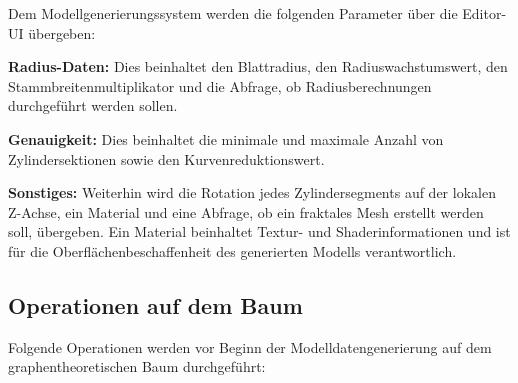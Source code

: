 Dem Modellgenerierungssystem werden die folgenden Parameter über die Editor-UI übergeben:

\begin{description}
	\item \textbf{Radius-Daten:} Dies beinhaltet den Blattradius, den Radiuswachstumswert, den Stammbreitenmultiplikator und die Abfrage, ob Radiusberechnungen durchgeführt werden sollen. \\
	
	\item \textbf{Genauigkeit:} Dies beinhaltet die minimale und maximale Anzahl von Zylindersektionen sowie den Kurvenreduktionswert. \\
	
	\item \textbf{Sonstiges:} Weiterhin wird die Rotation jedes Zylindersegments auf der lokalen Z-Achse, ein Material und eine Abfrage, ob ein fraktales Mesh erstellt werden soll, übergeben. Ein Material beinhaltet Textur- und Shaderinformationen und ist für die Oberflächenbeschaffenheit des generierten Modells verantwortlich.
\end{description}

\subsection{Operationen auf dem Baum}

Folgende Operationen werden vor Beginn der Modelldatengenerierung auf dem graphentheoretischen Baum durchgeführt:

